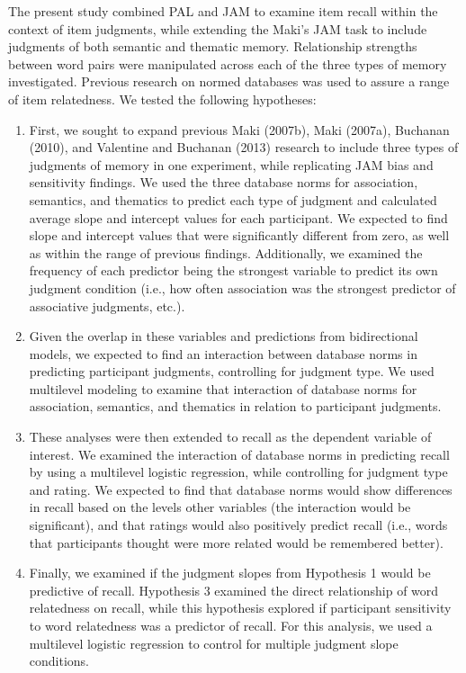\documentclass[english,man]{apa6}
\theoremstyle{definition}
\theoremstyle{definition}
\theoremstyle{definition}
\theoremstyle{remark}
\begin{document}
The present study combined PAL and JAM to examine item recall within the
context of item judgments, while extending the Maki's JAM task to
include judgments of both semantic and thematic memory. Relationship
strengths between word pairs were manipulated across each of the three
types of memory investigated. Previous research on normed databases was
used to assure a range of item relatedness. We tested the following
hypotheses:

\begin{enumerate}
\def\labelenumi{\arabic{enumi})}
\item
  First, we sought to expand previous Maki (2007b), Maki (2007a),
  Buchanan (2010), and Valentine and Buchanan (2013) research to include
  three types of judgments of memory in one experiment, while
  replicating JAM bias and sensitivity findings. We used the three
  database norms for association, semantics, and thematics to predict
  each type of judgment and calculated average slope and intercept
  values for each participant. We expected to find slope and intercept
  values that were significantly different from zero, as well as within
  the range of previous findings. Additionally, we examined the
  frequency of each predictor being the strongest variable to predict
  its own judgment condition (i.e., how often association was the
  strongest predictor of associative judgments, etc.).
\item
  Given the overlap in these variables and predictions from
  bidirectional models, we expected to find an interaction between
  database norms in predicting participant judgments, controlling for
  judgment type. We used multilevel modeling to examine that interaction
  of database norms for association, semantics, and thematics in
  relation to participant judgments.
\item
  These analyses were then extended to recall as the dependent variable
  of interest. We examined the interaction of database norms in
  predicting recall by using a multilevel logistic regression, while
  controlling for judgment type and rating. We expected to find that
  database norms would show differences in recall based on the levels
  other variables (the interaction would be significant), and that
  ratings would also positively predict recall (i.e., words that
  participants thought were more related would be remembered better).
\item
  Finally, we examined if the judgment slopes from Hypothesis 1 would be
  predictive of recall. Hypothesis 3 examined the direct relationship of
  word relatedness on recall, while this hypothesis explored if
  participant sensitivity to word relatedness was a predictor of recall.
  For this analysis, we used a multilevel logistic regression to control
  for multiple judgment slope conditions.
\end{enumerate}
\end{document}
